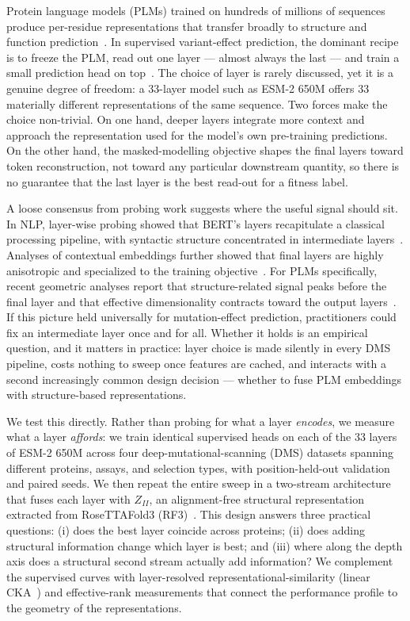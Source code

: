\documentclass[11pt]{article}
\begin{document}
Protein language models (PLMs) trained on hundreds of millions of sequences produce
per-residue representations that transfer broadly to structure and function
prediction~\cite{rives2021,lin2023}. In supervised variant-effect prediction, the dominant
recipe is to freeze the PLM, read out one layer --- almost always the last --- and train a
small prediction head on top~\cite{notin2023}. The choice of layer is rarely discussed, yet
it is a genuine degree of freedom: a 33-layer model such as ESM-2 650M offers 33 materially
different representations of the same sequence. Two forces make the choice non-trivial. On
one hand, deeper layers integrate more context and approach the representation used for the
model's own pre-training predictions. On the other hand, the masked-modelling objective
shapes the final layers toward token reconstruction, not toward any particular downstream
quantity, so there is no guarantee that the last layer is the best read-out for a fitness
label.

A loose consensus from probing work suggests where the useful signal should sit. In NLP,
layer-wise probing showed that BERT's layers recapitulate a classical processing pipeline,
with syntactic structure concentrated in intermediate
layers~\cite{tenney2019}. Analyses of contextual embeddings further showed that final layers
are highly anisotropic and specialized to the training objective~\cite{ethayarajh2019}. For
PLMs specifically, recent geometric analyses report that structure-related signal peaks
before the final layer and that effective dimensionality contracts toward the output
layers~\cite{beshkov2025}. If this picture held universally for mutation-effect prediction,
practitioners could fix an intermediate layer once and for all. Whether it holds is an
empirical question, and it matters in practice: layer choice is made silently in every DMS
pipeline, costs nothing to sweep once features are cached, and interacts with a second
increasingly common design decision --- whether to fuse PLM embeddings with structure-based
representations.

We test this directly. Rather than probing for what a layer \emph{encodes}, we measure what
a layer \emph{affords}: we train identical supervised heads on each of the 33 layers of
ESM-2 650M across four deep-mutational-scanning (DMS) datasets spanning different proteins,
assays, and selection types, with position-held-out validation and paired seeds. We then
repeat the entire sweep in a two-stream architecture that fuses each layer with $Z_{II}$, an
alignment-free structural representation extracted from RoseTTAFold3 (RF3)~\cite{corley2025}.
This design answers three practical questions: (i) does the best layer coincide across
proteins; (ii) does adding structural information change which layer is best; and (iii)
where along the depth axis does a structural second stream actually add information? We
complement the supervised curves with layer-resolved representational-similarity (linear
CKA~\cite{kornblith2019}) and effective-rank measurements that connect the performance
profile to the geometry of the representations.
\end{document}
